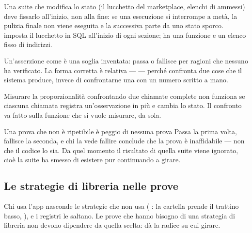 \begin{description}[leftmargin = 1.6em, style = nextline, itemsep = 6pt]

\item[Ripetibile]
  Una suite che modifica lo stato (il lucchetto del marketplace, elenchi di
  ammessi) deve fissarlo all'inizio, non alla fine: se una esecuzione si
  interrompe a metà, la pulizia finale non viene eseguita e la successiva
  parte da uno stato sporco.  imposta
  il lucchetto in SQL all'inizio di ogni sezione; 
  ha una funzione  e un elenco fisso di indirizzi.

\item[Senza soglie indovinate]
  Un'asserzione come  è una soglia inventata: passa o
  fallisce per ragioni che nessuno ha verificato. La forma corretta è
  relativa ---  --- perché
  confronta due cose che il sistema produce, invece di confrontarne una con
  un numero scritto a mano.

\item[Che isola ciò che misura]
  Misurare la proporzionalità confrontando due chiamate complete non
  funziona se ciascuna chiamata registra un'osservazione in più e cambia lo
  stato. Il confronto va fatto sulla funzione che si vuole misurare, da sola.

\end{description}

\begin{attenzione}{Una prova che non è ripetibile è peggio di nessuna prova}
Passa la prima volta, fallisce la seconda, e chi la vede fallire conclude
che la prova è inaffidabile --- non che il codice lo sia. Da quel momento il
risultato di quella suite viene ignorato, cioè la suite ha smesso di
esistere pur continuando a girare.
\end{attenzione}

\subsection{Le strategie di libreria nelle prove}

Chi usa l'app nasconde le strategie che non usa (
\textrightarrow{} : la cartella prende il trattino basso,
), e i registri le saltano. Le prove che hanno
bisogno di una strategia di libreria non devono dipendere da quella scelta:
 dà la radice su cui girare.

